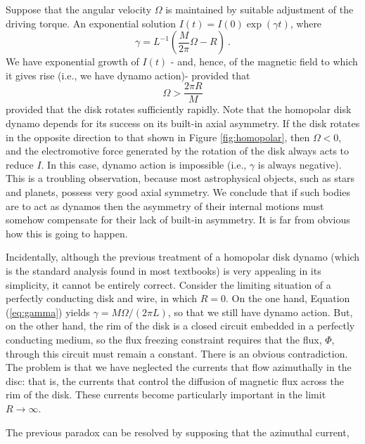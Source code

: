 \documentclass[12pt,a4paper]{article}
\begin{document}
Suppose that the angular velocity $\Omega$ is maintained by suitable adjustment of the driving torque. An exponential solution $I(t) = I(0) \exp(\gamma t)$, where
\begin{equation}
\gamma = L^{-1} \left(\dfrac{M}{2\pi} \Omega -R \right) ~.
\end{equation}
We have exponential growth of $I(t)$ - and, hence, of the magnetic field to which it gives rise (i.e., we have dynamo action)- provided that
\begin{equation}
\Omega > \dfrac{2\pi R}{M} 
\label{eq:gamma}
\end{equation}
provided that the disk rotates sufficiently rapidly. Note that the homopolar disk dynamo depends for its success on its built-in axial asymmetry. If the disk rotates in the opposite direction to that shown in Figure \ref{fig:homopolar}, then $\Omega < 0$, and the electromotive force generated by the rotation of the disk always acts to reduce $I$. In this case, dynamo action is impossible (i.e., $\gamma$ is always negative). This is a troubling observation, because most astrophysical objects, such as stars and planets, possess very good axial symmetry. We conclude that if such bodies are to act as dynamos then the asymmetry of their internal motions must somehow compensate for their lack of built-in asymmetry. It is far from obvious how this is going to happen.

Incidentally, although the previous treatment of a homopolar disk dynamo (which is the standard analysis found in most textbooks) is very appealing in its simplicity, it cannot be entirely correct. Consider the limiting situation of a perfectly conducting disk and wire, in which $R = 0$. On the one hand, Equation (\ref{eq:gamma}) yields $\gamma = M \Omega/(2\pi L)$, so that we still have dynamo action. But, on the other hand, the rim of the disk is a closed circuit embedded in a perfectly conducting medium, so the flux freezing constraint requires that the flux, $\Phi$, through this circuit must remain a constant. There is an obvious contradiction. The problem is that we have neglected the currents that flow azimuthally in the disc: that is, the currents that control the diffusion of magnetic flux across the rim of the disk. These currents become particularly important in the limit $R \rightarrow \infty$.

The previous paradox can be resolved by supposing that the azimuthal current,
\end{document}
